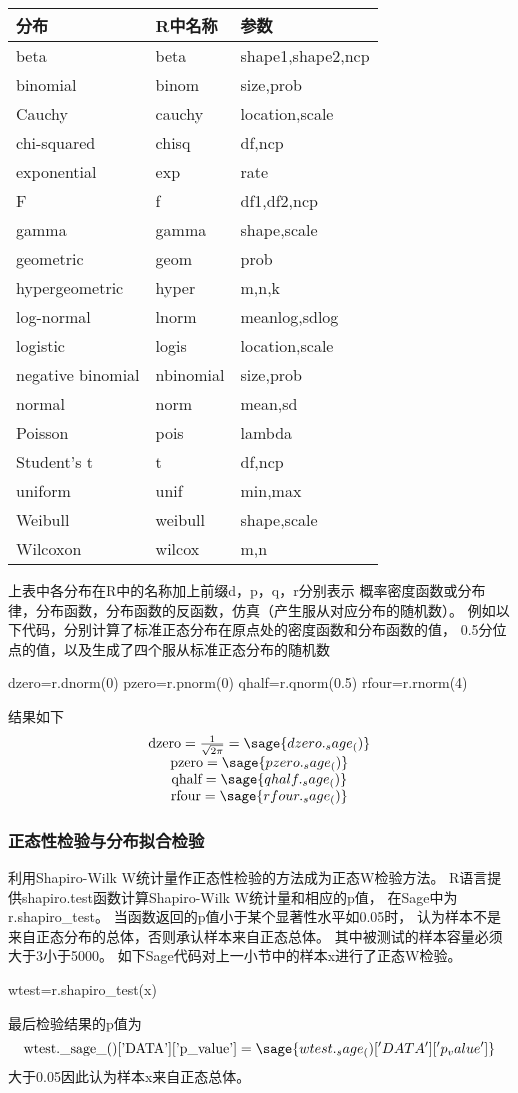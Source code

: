\begin{tabular}{lll}
\hline
分布 & R中名称 & 参数 \\
\hline
beta & beta & shape1,shape2,ncp \\
binomial & binom & size,prob \\
Cauchy & cauchy & location,scale \\
chi-squared & chisq & df,ncp \\
exponential & exp & rate \\
F & f & df1,df2,ncp \\
gamma & gamma & shape,scale \\
geometric & geom & prob \\
hypergeometric & hyper & m,n,k \\
log-normal & lnorm & meanlog,sdlog \\
logistic & logis & location,scale \\
negative binomial & nbinomial & size,prob \\
normal & norm & mean,sd \\
Poisson & pois & lambda \\
Student's t & t & df,ncp \\
uniform & unif & min,max \\
Weibull & weibull & shape,scale \\
Wilcoxon & wilcox & m,n \\
\hline
\end{tabular}

上表中各分布在R中的名称加上前缀d，p，q，r分别表示
概率密度函数或分布律，分布函数，分布函数的反函数，仿真（产生服从对应分布的随机数）。
例如以下代码，分别计算了标准正态分布在原点处的密度函数和分布函数的值，
0.5分位点的值，以及生成了四个服从标准正态分布的随机数
\begin{sageblock}
dzero=r.dnorm(0)
pzero=r.pnorm(0)
qhalf=r.qnorm(0.5)
rfour=r.rnorm(4)
\end{sageblock}
结果如下
\[
\begin{array}{c}
\textrm{dzero}=\frac{1}{\sqrt{2\pi}}=\sage{dzero._sage_()}\\
\textrm{pzero}=\sage{pzero._sage_()}\\
\textrm{qhalf}=\sage{qhalf._sage_()}\\
\textrm{rfour}=\sage{rfour._sage_()}
\end{array}
\]

\subsubsection{正态性检验与分布拟合检验}
利用Shapiro-Wilk W统计量作正态性检验的方法成为正态W检验方法。
R语言提供shapiro.test函数计算Shapiro-Wilk W统计量和相应的p值，
在Sage中为r.shapiro\_test。
当函数返回的p值小于某个显著性水平如0.05时，
认为样本不是来自正态分布的总体，否则承认样本来自正态总体。
其中被测试的样本容量必须大于3小于5000。
如下Sage代码对上一小节中的样本x进行了正态W检验。
\begin{sageblock}
wtest=r.shapiro_test(x)
\end{sageblock}
最后检验结果的p值为
\[\textrm{wtest.\_sage\_()['DATA']['p\_value']}=\sage{wtest._sage_()['DATA']['p_value']}\]
大于0.05因此认为样本x来自正态总体。

